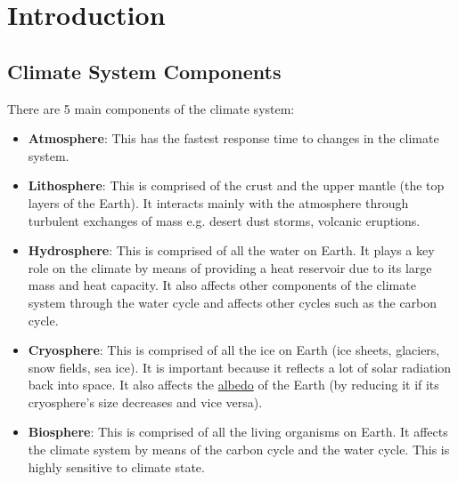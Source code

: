 \section{Introduction}
\label{sec:introduction}

\subsection{Climate System Components}
There are 5 main components of the climate system:
\begin{itemize}
    \item \textbf{Atmosphere}: This has the fastest response time to changes in the climate system. 
    \item \textbf{Lithosphere}: This is comprised of the crust and the upper mantle (the top layers of the Earth). It 
    interacts mainly with the atmosphere through turbulent exchanges of mass e.g. desert dust storms, volcanic eruptions.
    \item \textbf{Hydrosphere}: This is comprised of all the water on Earth. It plays a key role on the climate by means
     of providing a heat reservoir due to its large mass and heat capacity. It also affects other components of the 
     climate system through the water cycle and affects other cycles such as the carbon cycle.
    \item \textbf{Cryosphere}: This is comprised of all the ice on Earth (ice sheets, glaciers, snow fields, sea ice). 
    It is important because it reflects a lot of solar radiation back into space. It also affects the 
    \hyperlink{glo:albedo}{albedo} of the Earth (by reducing it if its cryosphere's size decreases and vice versa).
    \item \textbf{Biosphere}: This is comprised of all the living organisms on Earth. It affects the climate system by 
    means of the carbon cycle and the water cycle. This is highly sensitive to climate state.
\end{itemize}

